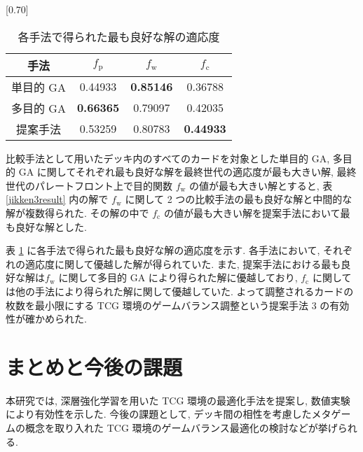 \documentclass[twocolumn]{jarticle}
\begin{document}
                 \begin{table}[t]
                  \centering
                  \caption{各手法で得られた最も良好な解の適応度}
                  \label{res_3}
                  \vspace{-0.3cm}
                  
                  \scalebox{0.70}[0.70]{
                    \begin{tabular}{|c|c|c|c|}
                      \hline
                      手法        & $f_\mathrm{p}$ & $f_\mathrm{w}$ & $f_\mathrm{c}$ \\ \hline \hline
                      単目的 GA      & 0.44933         & \textbf{0.85146}   & 0.36788          \\ \hline
                      多目的 GA  & \textbf{0.66365}         & 0.79097   & 0.42035          \\ \hline
                      提案手法   & 0.53259              &  0.80783     & \textbf{0.44933}  \\ \hline
                      \end{tabular}
                  }
                  \vspace{-0.3cm}
                  \end{table}
   比較手法として用いたデッキ内のすべてのカードを対象とした単目的 GA, 多目的 GA に関してそれぞれ最も良好な解を最終世代の適応度が最も大きい解, 最終世代のパレートフロント上で目的関数 $f_\mathrm{w}$ の値が最も大きい解とすると, 表 \ref{jikken3result} 内の解で $f_\mathrm{w}$ に関して 2 つの比較手法の最も良好な解と中間的な解が複数得られた. その解の中で $f_\mathrm{c}$ の値が最も大きい解を提案手法において最も良好な解とした.\par
   表 \ref{res_3} に各手法で得られた最も良好な解の適応度を示す.
各手法において, それぞれの適応度に関して優越した解が得られていた. また, 提案手法における最も良好な解は$f_\mathrm{w}$ に関して多目的 GA により得られた解に優越しており, $f_\mathrm{c}$ に関しては他の手法により得られた解に関して優越していた. よって調整されるカードの枚数を最小限にする TCG 環境のゲームバランス調整という提案手法 3 の有効性が確かめられた. 

\section{まとめと今後の課題}
本研究では, 深層強化学習を用いた TCG 環境の最適化手法を提案し, 数値実験により有効性を示した. 今後の課題として, デッキ間の相性を考慮したメタゲームの概念を取り入れた TCG 環境のゲームバランス最適化の検討などが挙げられる. 



\end{document}
